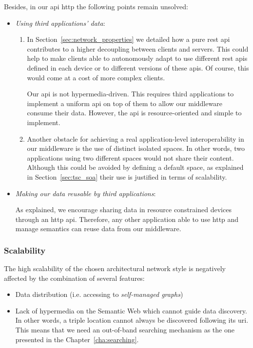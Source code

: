 Besides, in our \ac{api} \ac{http} the following points remain unsolved:
\begin{itemize} %
  \item \emph{Using third applications' data}:
  \begin{enumerate}
    \item In Section~\ref{sec:network_properties} we detailed how a pure \ac{rest} \ac{api} contributes to a higher decoupling between clients and servers.
	  This could help to make clients able to autonomously adapt to use different \ac{rest} \acp{api} defined in each device or to different versions of these \acp{api}. %
	  Of course, this would come at a cost of more complex clients. %
	  
	  Our \ac{api} is not hypermedia-driven.
	  This requires third applications to implement a uniform \ac{api} on top of them to allow our middleware consume their data.
	  However, the \ac{api} is resource-oriented and simple to implement. %
	  
    \item Another obstacle for achieving a real application-level interoperability in our middleware is the use of distinct isolated spaces.
	  In other words, two applications using two different spaces would not share their content.
	  Although this could be avoided by defining a default space, as explained in Section~\ref{sec:tsc_soa} their use is justified in terms of scalability.
  \end{enumerate}
  
  \item \emph{Making our data reusable by third applications}:
	
	As explained, we encourage sharing data in resource constrained devices through an \ac{http} \ac{api}. %
	Therefore, any other application able to use \ac{http} and manage semantics can reuse data from our middleware.
\end{itemize}


\subsubsection{Scalability}

The high scalability of the chosen architectural network style is negatively affected by the combination of several features:
\begin{itemize}
  \item Data distribution (i.e. accessing to \emph{self-managed graphs})
  \item Lack of hypermedia on the Semantic Web which cannot guide data discovery.
        In other words, a triple location cannot always be discovered following its \ac{uri}. %
        This means that we need an out-of-band searching mechanism as the one presented in the Chapter~\ref{cha:searching}.
\end{itemize}

